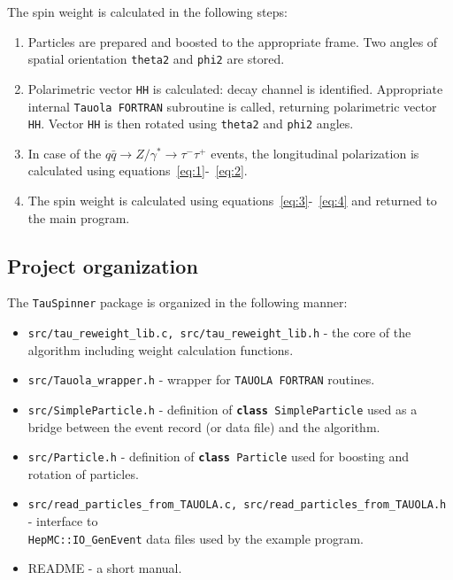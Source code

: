 \documentclass[12pt]{article}
\begin{document}
The spin weight is calculated in the following steps:
\begin{enumerate}
\item Particles are prepared and boosted to the appropriate frame. Two angles 
of spatial orientation {\tt theta2} and {\tt phi2} are stored.
\item Polarimetric vector {\tt HH} is calculated:
  decay channel is identified.
 \subitem Appropriate internal {\tt Tauola FORTRAN} subroutine is called, returning polarimetric vector {\tt HH}.
 \subitem Vector {\tt HH} is then rotated using {\tt theta2} and {\tt phi2} angles.
\item In case of the $q\bar{q}\rightarrow Z/\gamma^*\rightarrow\tau^-\tau^+$ events, the longitudinal polarization is calculated using equations~\ref{eq:1}-~\ref{eq:2}.
\item The spin weight is calculated using equations~\ref{eq:3}-~\ref{eq:4} and returned to the main program.
\end{enumerate}



\subsection{Project organization}

The {\tt TauSpinner} package is organized in the following manner:
\begin{itemize}
\item {\tt src/tau\_reweight\_lib.c, src/tau\_reweight\_lib.h} - the core of the algorithm including
   weight calculation functions.
\item {\tt src/Tauola\_wrapper.h} - wrapper for {\tt TAUOLA FORTRAN} routines.
\item {\tt src/SimpleParticle.h} - definition of {\tt {\bf class} SimpleParticle} used
   as a bridge between the event record (or data file) and the algorithm.
\item {\tt src/Particle.h} - definition of {\tt {\bf class} Particle} used
   for boosting and rotation of particles.
\item {\tt src/read\_particles\_from\_TAUOLA.c, src/read\_particles\_from\_TAUOLA.h} - interface to \\
   {\tt HepMC::IO\_GenEvent} data files used by the example program. 
\item {README} - a short manual. 
\end{itemize}
\end{document}
